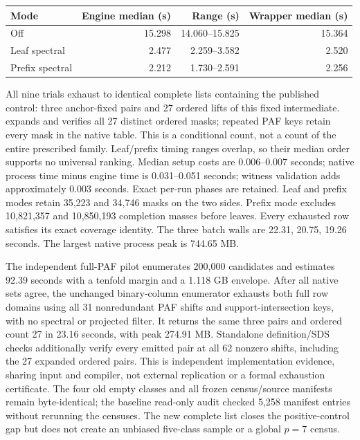 \documentclass[11pt]{article}
\begin{document}
\begin{center}
\begin{tabular}{lrrr}
\toprule
Mode & Engine median (s) & Range (s) & Wrapper median (s)\\\midrule
Off & 15.298 & 14.060--15.825 & 15.364\\
Leaf spectral & 2.477 & 2.259--3.582 & 2.520\\
Prefix spectral & 2.212 & 1.730--2.591 & 2.256\\
\bottomrule
\end{tabular}
\end{center}
All nine trials exhaust to identical complete lists containing the published
control: three anchor-fixed pairs and 27 ordered lifts of this fixed
intermediate.  expands and verifies all 27 distinct
ordered masks; repeated PAF keys retain every mask in the native table.
This is a conditional count, not a count of the entire prescribed family.
Leaf/prefix timing ranges overlap, so their median order supports no
universal ranking. Median setup costs are 0.006--0.007 seconds; native
process time minus engine time is 0.031--0.051 seconds; witness validation
adds approximately 0.003 seconds. Exact per-run phases are retained.
Leaf and prefix modes retain 35,223 and 34,746 masks on the two sides.
Prefix mode excludes 10,821,357 and 10,850,193 completion masses before
leaves. Every exhausted row satisfies its exact coverage identity.
The three batch walls are 22.31, 20.75, 19.26 seconds. The largest native process peak is 744.65 MB.

The independent full-PAF pilot enumerates 200,000 candidates and estimates
92.39 seconds with a tenfold margin and a 1.118 GB envelope. After all
native sets agree, the unchanged binary-column enumerator exhausts both
full row domains using all 31 nonredundant PAF shifts and support-intersection
keys, with no spectral or projected filter.
It returns the same three pairs and ordered count 27 in 23.16 seconds, with peak 274.91 MB.
Standalone definition/SDS checks additionally verify every emitted
pair at all 62 nonzero shifts, including the 27 expanded ordered pairs.
This is independent implementation evidence, sharing input and compiler,
not external replication or a formal exhaustion certificate. The four old
empty classes and all frozen census/source manifests remain byte-identical;
the baseline read-only audit checked 5,258 manifest entries without rerunning
the censuses. The new complete list closes the positive-control gap but
does not create an unbiased five-class sample or a global $p=7$ census.
\end{document}
